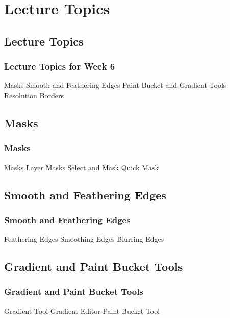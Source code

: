 \documentclass{beamer}
\begin{document}
	\section{Lecture Topics}
			\subsection{Lecture Topics}		
	\begin{frame}
		\frametitle{Lecture Topics for Week 6}
				\begin{outline}
					\1 Masks
					\1 Smooth and Feathering Edges
					\1 Paint Bucket and Gradient Tools
					\1 Resolution
					\1 Borders
				\end{outline}
		\end{frame}

			\subsection{Masks}		
				\begin{frame}
					\frametitle{Masks}
					\begin{outline}
						\1 Masks
						\1 Layer Masks
						\1 Select and Mask
						\1 Quick Mask
					\end{outline}
				\end{frame}
	
			\subsection{Smooth and Feathering Edges}		
				\begin{frame}
					\frametitle{Smooth and Feathering Edges}
						\begin{outline}
							\1 Feathering Edges
							\1 Smoothing Edges
							\1 Blurring Edges
						\end{outline}
				\end{frame}
			
			\subsection{Gradient and Paint Bucket Tools}		
				\begin{frame}
					\frametitle{Gradient and Paint Bucket Tools}
					\begin{outline}
						\1 Gradient Tool
						\1 Gradient Editor
						\1 Paint Bucket Tool
					\end{outline}
				\end{frame}
			
\end{document}
